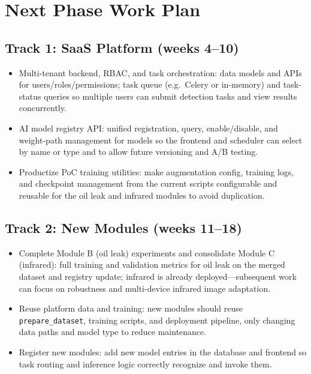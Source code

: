 \documentclass[12pt,a4paper]{article}
\begin{document}

\section{Next Phase Work Plan}

\subsection{Track 1: SaaS Platform (weeks 4--10)}

\begin{itemize}
  \item Multi-tenant backend, RBAC, and task orchestration: data models and APIs for users/roles/permissions; task queue (e.g.\ Celery or in-memory) and task-status queries so multiple users can submit detection tasks and view results concurrently.
  \item AI model registry API: unified registration, query, enable/disable, and weight-path management for models so the frontend and scheduler can select by name or type and to allow future versioning and A/B testing.
  \item Productize PoC training utilities: make augmentation config, training logs, and checkpoint management from the current scripts configurable and reusable for the oil leak and infrared modules to avoid duplication.
\end{itemize}

\subsection{Track 2: New Modules (weeks 11--18)}

\begin{itemize}
  \item Complete Module B (oil leak) experiments and consolidate Module C (infrared): full training and validation metrics for oil leak on the merged dataset and registry update; infrared is already deployed---subsequent work can focus on robustness and multi-device infrared image adaptation.
  \item Reuse platform data and training: new modules should reuse \texttt{prepare\_dataset}, training scripts, and deployment pipeline, only changing data paths and model type to reduce maintenance.
  \item Register new modules: add new model entries in the database and frontend so task routing and inference logic correctly recognize and invoke them.
\end{itemize}
\end{document}
